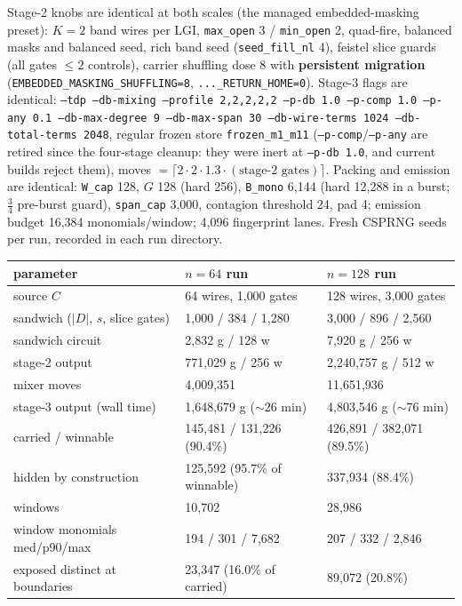 \documentclass[11pt]{article}
\newcommand{\code}[1]{\texttt{#1}}
\begin{document}
Stage-2 knobs are identical at both scales (the managed embedded-masking
preset): $K{=}2$ band wires per LGI, \code{max\_open} 3 / \code{min\_open}
2, quad-fire, balanced masks and balanced seed, rich band seed
(\code{seed\_fill\_nl} 4), feistel slice guards (all gates $\leq 2$
controls), carrier shuffling dose 8 with \textbf{persistent migration}
(\code{EMBEDDED\_MASKING\_SHUFFLING=8}, \code{...\_RETURN\_HOME=0}).
Stage-3 flags are identical: \code{--tdp --db-mixing --profile 2,2,2,2,2
--p-db 1.0 --p-comp 1.0 --p-any 0.1 --db-max-degree 9 --db-max-span 30
--db-wire-terms 1024 --db-total-terms 2048}, regular frozen store
\code{frozen\_m1\_m11} (\code{--p-comp}/\code{--p-any} are retired since
the four-stage cleanup: they were inert at \code{--p-db 1.0}, and current
builds reject them), moves $= \lceil 2\cdot 2\cdot 1.3\cdot
(\text{stage-2 gates})\rceil$. Packing and emission are identical:
\code{W\_cap} 128, $G$ 128 (hard 256), \code{B\_mono} 6{,}144 (hard
12{,}288 in a burst; $\tfrac34$ pre-burst guard), \code{span\_cap}
3{,}000, contagion threshold 24, pad 4; emission budget 16{,}384
monomials/window; 4{,}096 fingerprint lanes. Fresh CSPRNG seeds per run,
recorded in each run directory.

\begin{table}[H]\centering
\small
\begin{tabular}{lll}
\toprule
parameter & $n=64$ run & $n=128$ run \\
\midrule
source $C$ & 64 wires, 1{,}000 gates & 128 wires, 3{,}000 gates \\
sandwich ($|D|$, $s$, slice gates) & 1{,}000 / 384 / 1{,}280 & 3{,}000 / 896 / 2{,}560 \\
sandwich circuit & 2{,}832 g / 128 w & 7{,}920 g / 256 w \\
stage-2 output & 771{,}029 g / 256 w & 2{,}240{,}757 g / 512 w \\
mixer moves & 4{,}009{,}351 & 11{,}651{,}936 \\
stage-3 output (wall time) & 1{,}648{,}679 g ($\sim$26 min) & 4{,}803{,}546 g ($\sim$76 min) \\
carried / winnable & 145{,}481 / 131{,}226 (90.4\%) & 426{,}891 / 382{,}071 (89.5\%) \\
hidden by construction & 125{,}592 (95.7\% of winnable) & 337{,}934 (88.4\%) \\
windows & 10{,}702 & 28{,}986 \\
window monomials med/p90/max & 194 / 301 / 7{,}682 & 207 / 332 / 2{,}846 \\
exposed distinct at boundaries & 23{,}347 (16.0\% of carried) & 89{,}072 (20.8\%) \\
\bottomrule
\end{tabular}
\end{table}
\end{document}

